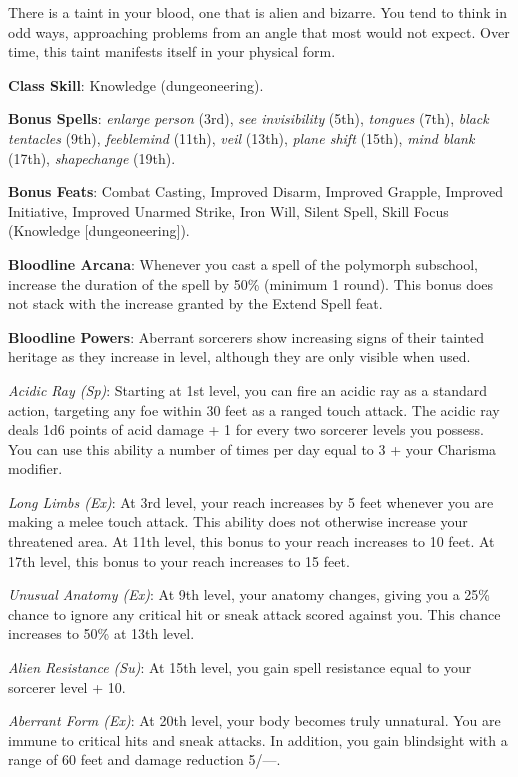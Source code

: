 				
There is a taint in your blood, one that is alien and bizarre. You tend to think in odd ways, approaching problems from an angle that most would not expect. Over time, this taint manifests itself in your physical form.
				
\textbf{Class Skill}: Knowledge (dungeoneering).
				
\textbf{Bonus Spells}: \textit{enlarge person} (3rd), \textit{see invisibility} (5th), \textit{tongues} (7th), \textit{black tentacles} (9th), \textit{feeblemind} (11th), \textit{veil }(13th), \textit{plane shift} (15th), \textit{mind blank} (17th), \textit{shapechange }(19th).
				
\textbf{Bonus Feats}: Combat Casting, Improved Disarm, Improved Grapple, Improved Initiative, Improved Unarmed Strike, Iron Will, Silent Spell, Skill Focus (Knowledge \mbox{$[$}dungeoneering\mbox{$]$}).
				
\textbf{Bloodline Arcana}: Whenever you cast a spell of the polymorph subschool, increase the duration of the spell by 50\% (minimum 1 round). This bonus does not stack with the increase granted by the Extend Spell feat.
				
\textbf{Bloodline Powers}: Aberrant sorcerers show increasing signs of their tainted heritage as they increase in level, although they are only visible when used.
				
\textit{Acidic Ray (Sp)}: Starting at 1st level, you can fire an acidic ray as a standard action, targeting any foe within 30 feet as a ranged touch attack. The acidic ray deals 1d6 points of acid damage + 1 for every two sorcerer levels you possess. You can use this ability a number of times per day equal to 3 + your Charisma modifier.
				
\textit{Long Limbs (Ex)}: At 3rd level, your reach increases by 5 feet whenever you are making a melee touch attack. This ability does not otherwise increase your threatened area. At 11th level, this bonus to your reach increases to 10 feet. At 17th level, this bonus to your reach increases to 15 feet.
				
\textit{Unusual Anatomy (Ex)}: At 9th level, your anatomy changes, giving you a 25\% chance to ignore any critical hit or sneak attack scored against you. This chance increases to 50\% at 13th level.
				
\textit{Alien Resistance (Su)}: At 15th level, you gain spell resistance equal to your sorcerer level + 10.
				
\textit{Aberrant Form (Ex)}: At 20th level, your body becomes truly unnatural. You are immune to critical hits and sneak attacks. In addition, you gain blindsight with a range of 60 feet and damage reduction 5/---.
				
